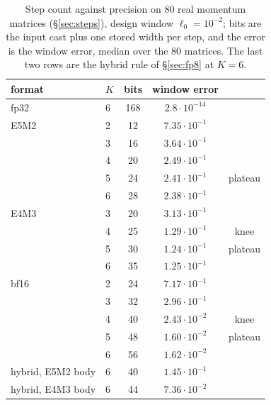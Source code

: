 \begin{table}[h]
\centering
\caption{Step count against precision on 80 real momentum matrices (\S\ref{sec:steps}),
design window $\ell_0=10^{-2}$; bits are the input cast plus one stored width per step,
and the error is the window error, median over the 80 matrices.  The last two rows are the
hybrid rule of \S\ref{sec:fp8} at $K=6$.}
\label{tab:steps}
\begin{tabular}{llccc}
\toprule
format & $K$ & bits & window error & \\
\midrule
fp32    & 6 & 168 & $2.8\cdot10^{-14}$ & \\
\midrule
E5M2    & 2 & 12 & $7.35\cdot10^{-1}$ & \\
        & 3 & 16 & $3.64\cdot10^{-1}$ & \\
        & 4 & 20 & $2.49\cdot10^{-1}$ & \\
        & 5 & 24 & $2.41\cdot10^{-1}$ & plateau \\
        & 6 & 28 & $2.38\cdot10^{-1}$ & \\
\midrule
E4M3    & 3 & 20 & $3.13\cdot10^{-1}$ & \\
        & 4 & 25 & $1.29\cdot10^{-1}$ & knee \\
        & 5 & 30 & $1.24\cdot10^{-1}$ & plateau \\
        & 6 & 35 & $1.25\cdot10^{-1}$ & \\
\midrule
bf16    & 2 & 24 & $7.17\cdot10^{-1}$ & \\
        & 3 & 32 & $2.96\cdot10^{-1}$ & \\
        & 4 & 40 & $2.43\cdot10^{-2}$ & knee \\
        & 5 & 48 & $1.60\cdot10^{-2}$ & plateau \\
        & 6 & 56 & $1.62\cdot10^{-2}$ & \\
\midrule
hybrid, E5M2 body & 6 & 40 & $1.45\cdot10^{-1}$ & \\
hybrid, E4M3 body & 6 & 44 & $7.36\cdot10^{-2}$ & \\
\bottomrule
\end{tabular}
\end{table}

